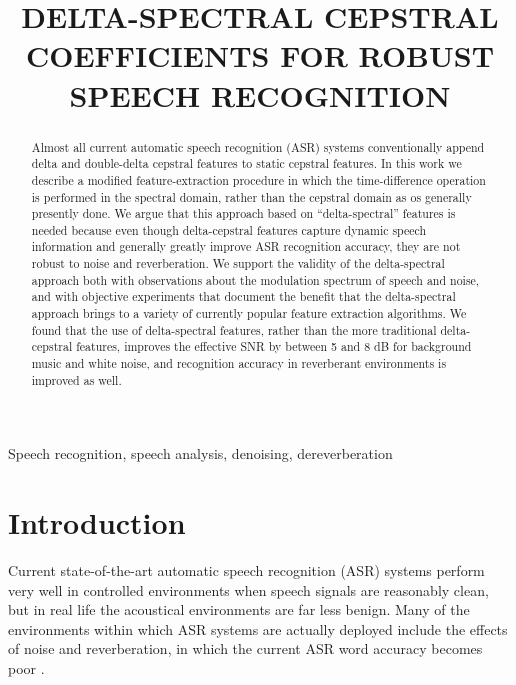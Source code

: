\documentclass{article}
\begin{document}
\title{DELTA-SPECTRAL CEPSTRAL COEFFICIENTS FOR ROBUST SPEECH RECOGNITION}


\address{Department of Electrical and Computer Engineering$^{1}$\\
   Language Technologies Institute$^{2}$\\
  Carnegie Mellon University, Pittsburgh, PA 15213 \\
 Email: {\{kshitizk, chanwook, rms\}}@cs.cmu.edu}
\maketitle

\begin{abstract}
Almost all  current automatic speech recognition (ASR) systems conventionally append delta and double-delta cepstral features to static cepstral features.  In this work we describe a modified feature-extraction procedure in which the time-difference operation is performed in the spectral domain, rather than the cepstral domain as os generally presently done.  We argue that this approach based on ``delta-spectral'' features is needed because
even though delta-cepstral features capture dynamic speech information and generally greatly improve   ASR recognition accuracy,
they are not robust to noise and reverberation.   We support the validity of the delta-spectral approach both with observations about the modulation spectrum of speech and noise,  and with objective experiments that document the benefit that the delta-spectral approach brings to a variety of currently popular feature extraction algorithms.  We found that the use of delta-spectral features, rather than the more traditional delta-cepstral features, improves the effective SNR by between 5 and 8 dB for background music and white noise, and   recognition accuracy in reverberant environments is improved as well.
\end{abstract}

\begin{keywords}
Speech recognition, speech analysis, denoising, dereverberation
\end{keywords}

\section{Introduction}
\label{sec:intro} Current state-of-the-art automatic speech recognition (ASR) systems perform very well in
controlled environments when speech signals are reasonably clean, but in real life the acoustical environments are far less  benign.  Many of the environments within which ASR systems are actually deployed include the effects of noise and reverberation, in which the current ASR word accuracy becomes poor \cite{SLP, VTS,Rasta, Boll79, LIFE10}.
\end{document}
